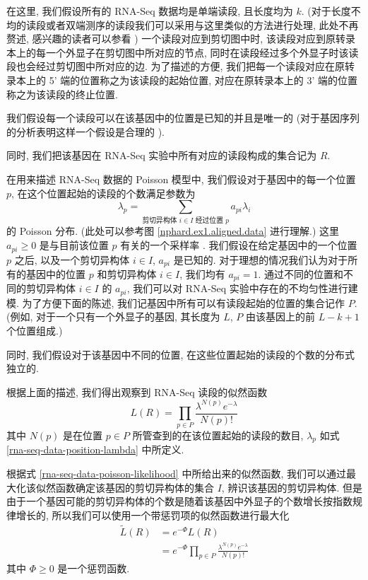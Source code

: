 在这里, 我们假设所有的 RNA-Seq 数据均是单端读段, 且长度均为 $k$. 
(对于长度不均的读段或者双端测序的读段我们可以采用与这里类似的方法进行处理, 
此处不再赘述, 感兴趣的读者可以参看 ) 
一个读段对应到剪切图中时, 该读段对应到原转录本上的每一个外显子在剪切图中所对应的节点, 
同时在读段经过多个外显子时该读段也会经过剪切图中所对应的边. 
为了描述的方便, 我们把每一个读段对应在原转录本上的 5' 端的位置称之为该读段的起始位置, 
对应在原转录本上的 3' 端的位置称之为该读段的终止位置. 

我们假设每一个读段可以在该基因中的位置是已知的并且是唯一的 
(对于基因序列的分析表明这样一个假设是合理的 \cite{peng2011t}). 

同时, 我们把该基因在 RNA-Seq 实验中所有对应的读段构成的集合记为 $R$. 

在用来描述 RNA-Seq 数据的 Poisson 模型中, 
我们假设对于基因中的每一个位置 $p$, 
在这个位置起始的读段的个数满足参数为 
\begin{equation}
\label{rna-seq-data-position-lambda}
\lambda_p = \sum_{\text{剪切异构体 $i \in I$ 经过位置 $p$}} a_{pi} \lambda_i
\end{equation}
的 Poisson 分布. (此处可以参考图 \ref{nphard.ex1.aligned.data} 进行理解.)
这里 $a_{pi} \geq 0$ 是与目前该位置 $p$ 有关的一个采样率 \cite{2011arXiv1106.3211S}. 
我们假设在给定基因中的一个位置 $p$ 之后, 以及一个剪切异构体 $i \in I$, 
$a_{pi}$ 是已知的. 
对于理想的情况我们认为对于所有的基因中的位置 $p$ 和剪切异构体 $i\in I$, 
我们均有 $a_{pi}=1$. 
通过不同的位置和不同的剪切异构体 $i\in I$ 的 $a_{pi}$, 
我们可以对 RNA-Seq 实验中存在的不均匀性进行建模. 
为了方便下面的陈述, 我们记基因中所有可以有读段起始的位置的集合记作 $P$. 
(例如, 对于一个只有一个外显子的基因, 其长度为 $L$, 
$P$ 由该基因上的前 $L-k+1$ 个位置组成.)

同时, 我们假设对于该基因中不同的位置, 
在这些位置起始的读段的个数的分布式独立的. 

根据上面的描述, 我们得出观察到 RNA-Seq 读段的似然函数
\begin{equation}
\label{rna-seq-data-poisson-likelihood}
L(R)= \prod_{p\in P} \frac{\lambda^{N(p)} e^{-\lambda}}{N(p)!}
\end{equation}
其中 $N(p)$ 是在位置 $p\in P$ 所管查到的在该位置起始的读段的数目, 
$\lambda_p$ 如式 \eqref{rna-seq-data-position-lambda} 中所定义. 

根据式 \eqref{rna-seq-data-poisson-likelihood} 中所给出来的似然函数, 
我们可以通过最大化该似然函数确定该基因的剪切异构体的集合 $I$, 
辨识该基因的剪切异构体. 
但是由于一个基因可能的剪切异构体的个数是随着该基因中外显子的个数增长按指数规律增长的, 
所以我们可以使用一个带惩罚项的似然函数进行最大化
\begin{align}
\tilde{L}(R) &= e^{-\Phi} L(R) \nonumber \\ 
\label{rna-seq-data-poisson-penalized-likelihood}
&= e^{-\Phi} \prod_{p\in P} \frac{\lambda^{N(p)} e^{-\lambda}}{N(p)!}
\end{align}
其中 $\Phi \geq 0$ 是一个惩罚函数. 

